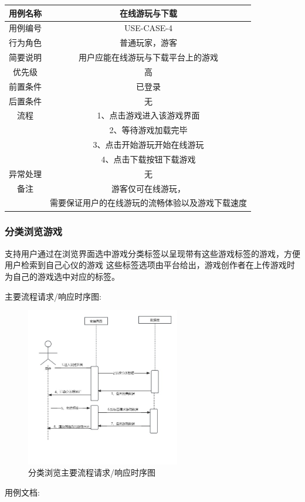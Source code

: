 \documentclass[12pt]{ctexart} %
\begin{document}
\begin{tabular}{|c|c|}
  \hline
  用例名称& 在线游玩与下载\\
  \hline
  用例编号 & USE-CASE-4\\
  \hline
  行为角色 & 普通玩家，游客\\
  \hline
  简要说明 & 用户应能在线游玩与下载平台上的游戏\\
  \hline
  优先级 & 高\\
  \hline
  前置条件 & 已登录\\
  \hline
  后置条件 & 无\\
  \hline
  流程 & 1、点击游戏进入该游戏界面\\
      &  2、等待游戏加载完毕\\
      & 3、点击开始游玩开始在线游玩\\
      & 4、点击下载按钮下载游戏\\
  \hline
  异常处理 & 无\\
  \hline
  备注 & 游客仅可在线游玩，\\
       &需要保证用户的在线游玩的流畅体验以及游戏下载速度\\
  \hline
\end{tabular}

\subsubsection{分类浏览游戏}
支持用户通过在浏览界面选中游戏分类标签以呈现带有这些游戏标签的游戏，方便用户检索到自己心仪的游戏
这些标签选项由平台给出，游戏创作者在上传游戏时为自己的游戏选中对应的标签。

主要流程请求/响应时序图:
\begin{figure}[ht]
  \centering
  \includegraphics[width=0.6\textwidth]{yongli5.jpg}
  \caption{分类浏览主要流程请求/响应时序图}
\end{figure}
用例文档:
\end{document}
